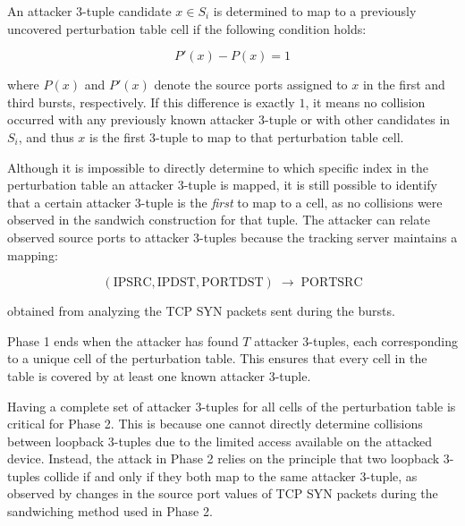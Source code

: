 \documentclass{report}
\begin{document}

An attacker 3-tuple candidate $x \in S_i$ is determined to map to a previously uncovered perturbation table cell if the following condition holds:

\[
P'(x) - P(x) = 1
\]

where $P(x)$ and $P'(x)$ denote the source ports assigned to $x$ in the first and third bursts, respectively. If this difference is exactly $1$, it means no collision occurred with any previously known attacker 3-tuple or with other candidates in $S_i$, and thus $x$ is the first 3-tuple to map to that perturbation table cell.


Although it is impossible to directly determine to which specific index in the perturbation table an attacker 3-tuple is mapped, it is still possible to identify that a certain attacker 3-tuple is the \emph{first} to map to a cell, as no collisions were observed in the sandwich construction for that tuple. The attacker can relate observed source ports to attacker 3-tuples because the tracking server maintains a mapping:

\[
(\mathrm{IPSRC}, \mathrm{IPDST}, \mathrm{PORTDST}) \;\rightarrow\; \mathrm{PORTSRC}
\]

obtained from analyzing the TCP SYN packets sent during the bursts.


Phase 1 ends when the attacker has found $T$ attacker 3-tuples, each corresponding to a unique cell of the perturbation table. This ensures that every cell in the table is covered by at least one known attacker 3-tuple.


Having a complete set of attacker 3-tuples for all cells of the perturbation table is critical for Phase 2. This is because one cannot directly determine collisions between loopback 3-tuples due to the limited access available on the attacked device. Instead, the attack in Phase 2 relies on the principle that two loopback 3-tuples collide if and only if they both map to the same attacker 3-tuple, as observed by changes in the source port values of TCP SYN packets during the sandwiching method used in Phase 2.
\end{document}
